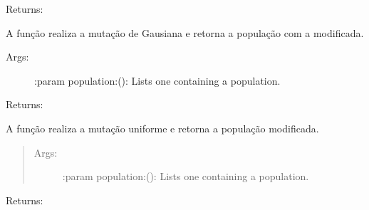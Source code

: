 \documentclass[letterpaper,10pt,english]{sphinxmanual}
\begin{document}
\begin{fulllineitems}
\begin{fulllineitems}
\begin{quote}
\begin{description}
\end{description}
\end{quote}

Returns:

\end{fulllineitems}


\begin{fulllineitems}
\label{\detokenize{index:ga.Genetic.mutation_gaussian}}
A função realiza a mutação de Gausiana e retorna a população com a modificada.
\begin{description}
\item[{Args:}] \leavevmode
:param population:(): Lists one containing a population.

\end{description}

Returns:

\end{fulllineitems}


\begin{fulllineitems}
\label{\detokenize{index:ga.Genetic.mutation_uniform}}
A função realiza a mutação uniforme e retorna a população modificada.
\begin{quote}
\begin{description}
\item[{Args:}] \leavevmode
:param population:(): Lists one containing a population.

\end{description}
\end{quote}

Returns:

\end{fulllineitems}



\end{fulllineitems}
\end{document}
